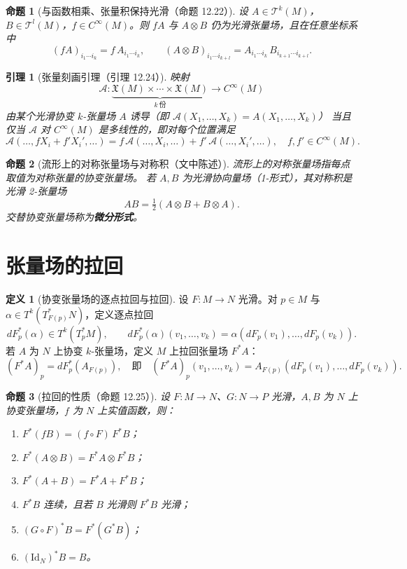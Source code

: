 \documentclass[11pt]{article}
\theoremstyle{definition}
\newtheorem{definition}{定义}[section]
\theoremstyle{plain}
\newtheorem{proposition}{命题}[section]
\newtheorem{lemma}{引理}[section]
\newcommand{\Cinf}{C^{\infty}}
\newcommand{\X}{\mathfrak{X}}
\newcommand{\T}{\mathcal{T}}
\newcommand{\id}{\mathrm{Id}}
\newcommand{\ot}{\otimes}
\begin{document}
\begin{proposition}[与函数相乘、张量积保持光滑（命题 12.22）]
设 $A\in\T^k(M)$，$B\in\T^l(M)$，$f\in\Cinf(M)$。则 $fA$ 与 $A\ot B$ 仍为光滑张量场，且在任意坐标系中
\[
(fA)_{i_1\cdots i_k}=f\,A_{i_1\cdots i_k},\qquad
(A\ot B)_{i_1\cdots i_{k+l}}=A_{i_1\cdots i_k}\,B_{i_{k+1}\cdots i_{k+l}}.
\]
\end{proposition}

\begin{lemma}[张量刻画引理（引理 12.24）]
映射
\[
\mathcal{A}:\underbrace{\X(M)\times\cdots\times\X(M)}_{k\ \text{份}}\to \Cinf(M)
\]
由某个光滑协变 $k$-张量场 $A$ 诱导（即 $\mathcal{A}(X_1,\dots,X_k)=A(X_1,\dots,X_k)$）
当且仅当 $\mathcal{A}$ 对 $\Cinf(M)$ 是多线性的，即对每个位置满足
\[
\mathcal{A}(\dots,fX_i+f'X_i',\dots)=f\,\mathcal{A}(\dots,X_i,\dots)+f'\,\mathcal{A}(\dots,X_i',\dots),
\quad f,f'\in\Cinf(M).
\]
\end{lemma}

\begin{proposition}[流形上的对称张量场与对称积（文中陈述）]
流形上的对称张量场指每点取值为对称张量的协变张量场。
若 $A,B$ 为光滑协向量场（1-形式），其对称积是光滑 2-张量场
\[
AB=\tfrac12(A\ot B+B\ot A).
\]
交替协变张量场称为\textbf{微分形式}。
\end{proposition}

\section{张量场的拉回}

\begin{definition}[协变张量场的逐点拉回与拉回]
设 $F:M\to N$ 光滑。对 $p\in M$ 与 $\alpha\in T^k(T^*_{F(p)}N)$，定义逐点拉回
\[
dF_p^*(\alpha)\in T^k(T_p^*M),\qquad
dF_p^*(\alpha)(v_1,\dots,v_k)=\alpha(dF_p(v_1),\dots,dF_p(v_k)).
\]
若 $A$ 为 $N$ 上协变 $k$-张量场，定义 $M$ 上拉回张量场 $F^*A$：
\[
(F^*A)_p=dF_p^*(A_{F(p)}),
\quad\text{即}\quad
(F^*A)_p(v_1,\dots,v_k)=A_{F(p)}(dF_p(v_1),\dots,dF_p(v_k)).
\]
\end{definition}

\begin{proposition}[拉回的性质（命题 12.25）]
设 $F:M\to N$、$G:N\to P$ 光滑，$A,B$ 为 $N$ 上协变张量场，$f$ 为 $N$ 上实值函数，则：
\begin{enumerate}[label=(\alph*),leftmargin=2em]
\item $F^*(fB)=(f\circ F)\,F^*B$；
\item $F^*(A\ot B)=F^*A\ot F^*B$；
\item $F^*(A+B)=F^*A+F^*B$；
\item $F^*B$ 连续，且若 $B$ 光滑则 $F^*B$ 光滑；
\item $(G\circ F)^*B=F^*(G^*B)$；
\item $(\id_N)^*B=B$。
\end{enumerate}
\end{proposition}
\end{document}
